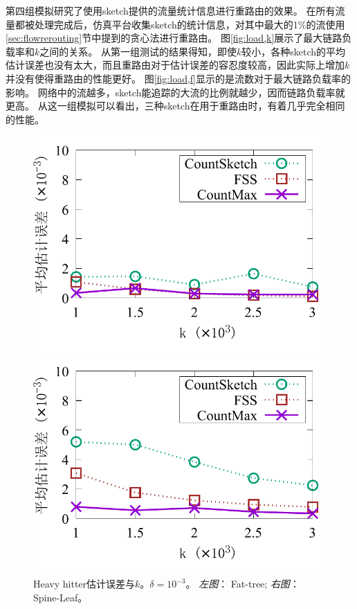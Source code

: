 第四组模拟研究了使用sketch提供的流量统计信息进行重路由的效果。
在所有流量都被处理完成后，仿真平台收集sketch的统计信息，对其中最大的1\%的流使用\ref{sec:flowrerouting}节中提到的贪心法进行重路由。
图\ref{fig:load,k}展示了最大链路负载率和$k$之间的关系。
从第一组测试的结果得知，即使$k$较小，各种sketch的平均估计误差也没有太大，而且重路由对于估计误差的容忍度较高，因此实际上增加$k$并没有使得重路由的性能更好。
图\ref{fig:load,f}显示的是流数对于最大链路负载率的影响。
网络中的流越多，sketch能追踪的大流的比例就越少，因而链路负载率就更高。
从这一组模拟可以看出，三种sketch在用于重路由时，有着几乎完全相同的性能。

\begin{figure}[ht]
	\centering
	\begin{minipage}[t]{0.49\linewidth}
		\centering
		\includegraphics[width=\linewidth]{fig/ft_k_hh_1000.pdf}
	\end{minipage}\vspace{-0.6em}%
	\begin{minipage}[t]{0.49\linewidth}
		\centering
		\includegraphics[width=\linewidth]{fig/hy_k_hh_1000.pdf}
	\end{minipage}\vspace{-0.6em}%
	\caption{\textnormal{Heavy hitter估计误差与$k$。$\delta=10^{-3}$。 \textit{左图}： Fat-tree; \textit{右图}： Spine-Leaf。}}
	\label{fig:hh,k,1000}
\end{figure}

